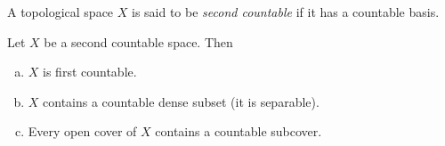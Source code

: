 \begin{fdef}
	A topological space $X$ is said to be \textit{second countable} if it has a countable basis.
\end{fdef}

\begin{theorem}
	\label{theo: second countable then}
	Let $X$ be a second countable space. Then
	\begin{enumerate}[(a)]
		\item $X$ is first countable.
		\item $X$ contains a countable dense subset (it is separable).
		\item Every open cover of $X$ contains a countable subcover.
	\end{enumerate}
\end{theorem}